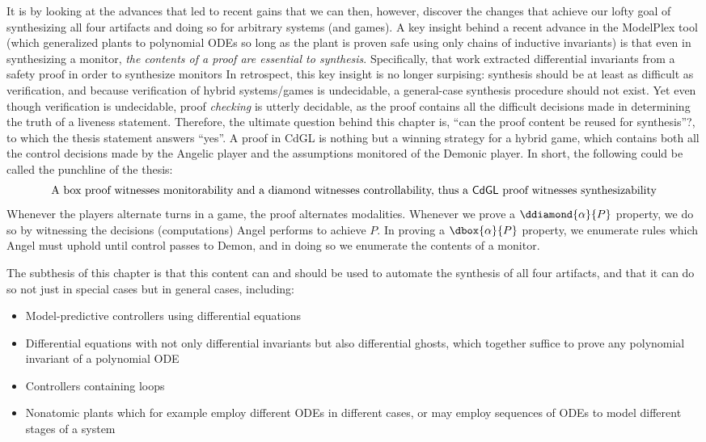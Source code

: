 \documentclass[12pt]{cmuthesis}
\theoremstyle{definition}
\theoremstyle{remark}
\newcommand{\CdGL}{\textsf{CdGL}\xspace}
\newcommand{\ModelPlex}{ModelPlex\xspace}
\begin{document}
It is by looking at the advances that led to recent gains that we can then, however, discover the changes that achieve our lofty goal of synthesizing all four artifacts and doing so for arbitrary systems (and games).
A key insight behind a recent advance in the \ModelPlex tool (which generalized plants to polynomial ODEs so long as the plant is proven safe using only chains of inductive invariants) is that even in synthesizing a monitor, \emph{the contents of a proof are essential to synthesis}.
Specifically, that work extracted differential invariants from a safety proof in order to synthesize monitors
In retrospect, this key insight is no longer surpising: synthesis should be at least as difficult as verification, and because verification of hybrid systems/games is undecidable, a general-case synthesis procedure should not exist.
Yet even though verification is undecidable, proof \emph{checking} is utterly decidable, as the proof contains all the difficult decisions made in determining the truth of a liveness statement.
Therefore, the ultimate question behind this chapter is, ``can the proof content be reused for synthesis''?, to which the thesis statement answers ``yes''.
A proof in \CdGL is nothing but a winning strategy for a hybrid game, which contains both all the control decisions made by the Angelic player and the assumptions monitored of the Demonic player.
In short, the following could be called the punchline of the thesis:
\[\text{A box proof witnesses monitorability and a diamond witnesses controllability, thus a \CdGL proof witnesses synthesizability}\]
Whenever the players alternate turns in a game, the proof alternates modalities.
Whenever we prove a $\ddiamond{\alpha}{P}$ property, we do so by witnessing the decisions (computations) Angel performs to achieve $P$.
In proving a $\dbox{\alpha}{P}$ property, we enumerate rules which Angel must uphold until control passes to Demon, and in doing so we enumerate the contents of a monitor.

The subthesis of this chapter is that this content can and should be used to automate the synthesis of all four artifacts, and that it can do so not just in special cases but in general cases, including:
\begin{itemize}
\item Model-predictive controllers using differential equations
\item Differential equations with not only differential invariants but also differential ghosts, which together suffice to prove any polynomial invariant of a polynomial ODE
\item Controllers containing loops
\item Nonatomic plants which for example employ different ODEs in different cases, or may employ sequences of ODEs to model different stages of a system
\end{itemize}
\end{document}
